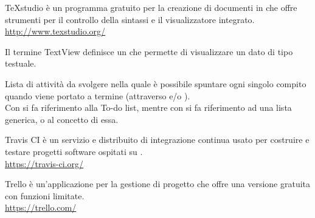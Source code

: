 TeXstudio è un programma gratuito per la creazione di documenti in \glossario{\LaTeX} che offre strumenti per il controllo della sintassi e il visualizzatore integrato.\\
\url{http://www.texstudio.org/}

Il termine TextView definisce un  che permette di visualizzare un dato di tipo testuale.

Lista di attività da svolgere nella quale è possibile spuntare ogni singolo compito quando viene portato a termine (attraverso  e/o ).\\
Con  si fa riferimento alla  To-do list, mentre con  si fa riferimento ad una lista generica, o al concetto di essa.

Travis CI è un servizio  e distribuito di integrazione continua usato per costruire e testare progetti software ospitati su .\\
\url{https://travis-ci.org/}

Trello è un’applicazione per la gestione di progetto che offre una versione gratuita con funzioni limitate.\\
\url{https://trello.com/}
\clearpage
